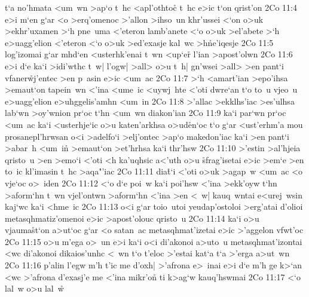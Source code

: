 t`a
no'hmata
<um~wn
>ap`o
t~hc
<apl'othto\r{c}
t~hc
e>ic
t`on
qrist'on\bibvsend
\vs 2Co 11:4
e>i
m`en
g`ar
<o
>erq'omenoc
>'allon
>ihso~un
khr'ussei
<`on
o>uk
>ekhr'uxamen
>`h
pne~uma
<'eteron
lamb'anete
<`o
o>uk
>el'abete
>`h
e>uagg'elion
<'eteron
<`o
o>uk
>ed'exasje
kal~wc
>h\r{n}e'iqesje\bibvsend
{}
\vs 2Co 11:5
log'izomai
g`ar
mhd`en
<usterhk'enai
t~wn
<up`er\r{}
l'ian
>apost'olwn\bibvsend
\vs 2Co 11:6
e>i
d`e
ka`i
>idi'wthc
t~w|
l'ogw|
>all>
o>u
t~h|
gn'wsei
>all>
>en
pant`i
vfaner\r{w}j'entec
>en
p~asin
e>ic
<um~ac\bibvsend
\vs 2Co 11:7
>`h
<amart'ian
>epo'ihsa
>emaut`on
tapein~wn
<'ina
<ume~ic
<uywj~hte
<'oti
dwre`an
t`o
to~u
vjeo~u
e>uagg'elion
e>uhggelis'amhn
<um~in\bibvsend
\vs 2Co 11:8
>'allac
>ekklhs'iac
>es'ulhsa
lab`wn
>oy'wnion
pr`oc
t`hn
<um~wn
diakon'ian\bibvsend
\vs 2Co 11:9
ka`i
par`wn
pr`oc
<um~ac
ka`i
<usterhje`ic
o>u
katen'arkhsa
o>ud\r{e}n`oc
t`o
g`ar
<ust'erhm'a
mou
prosanepl'hrwsan
o<i
>adelfo`i
>elj'ontec
>ap`o
makedon'iac
ka`i
>en
pant`i
>abar~h
<um~in\r{}
>emaut`on
>et'hrhsa
ka`i
thr'hsw\bibvsend
\vs 2Co 11:10
>'estin
>al'hjeia
qristo~u
>en
>emo`i
<'oti
<h
ka'uqhsic
a<'uth
o>u
\r{s}frag'isetai
e>ic
>em`e
>en
to~ic
kl'imasin
t~hc
>aqa"'iac\bibvsend
\vs 2Co 11:11
dia\r{t}`i
<'oti
o>uk
>agap~w
<um~ac
<o
vje`oc
o>~iden\bibvsend
\vs 2Co 11:12
<`o
d`e
poi~w
ka`i
poi'hsw
<'ina
>ekk'oyw
t`hn
>aform`hn
t~wn
vjel'ontwn
>aform`hn
<'ina
>en
<~w|
kauq~wntai
e<urej~wsin
kaj`wc
ka`i
<hme~ic\bibvsend
\vs 2Co 11:13
o<i
g`ar
toio~utoi
yeudap'ostoloi
>erg'atai
d'olioi
metasqhmatiz'omenoi
e>ic
>apost'olouc
qristo~u\bibvsend
\vs 2Co 11:14
ka`i
o>u
vjauma\r{s}t`on
a>ut`oc
g`ar
<o
satan~ac
metasqhmat'izetai
e>ic
>'aggelon
vfwt'oc\bibvsend
\vs 2Co 11:15
o>u
m'ega
o>~un
e>i
ka`i
o<i
di'akonoi
a>uto~u
metasqhmat'izontai
<wc
di'akonoi
dikaios'unhc
<~wn
t`o
t'eloc
>'estai
kat`a
t`a
>'erga
a>ut~wn\bibvsend
\vs 2Co 11:16
p'alin
l'egw
m'h
t'ic
me
d'oxh|
>'afrona
e>~inai
e>i
d`e
m'h
ge
k>`an
<wc
>'afrona
d'exasj'e
me
<'ina
mikr'on\r{}
ti
k>ag`w
kauq'hswmai\bibvsend
\vs 2Co 11:17
<`o
lal~w
o>u
lal~w\r{}
